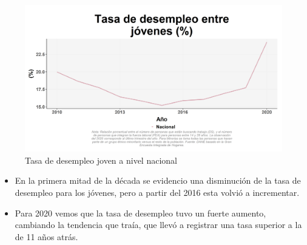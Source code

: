     \begin{figure}[H]
        \caption{Tasa de desempleo joven a nivel nacional \label{map_result_2} }
        \begin{center}
        \includegraphics[width=\textwidth,keepaspectratio]{img/var_56_trend.png}
        \end{center}
    \end{figure}
            \begin{itemize}
                \item En la primera mitad de la década se evidencio una disminución de la tasa de desempleo para los jóvenes, pero a partir del 2016 esta volvió a incrementar.
                \item Para 2020 vemos que la tasa de desempleo tuvo un fuerte aumento, cambiando la tendencia que traía, que llevó a registrar una tasa superior a la de 11 años atrás.
                \end{itemize}

